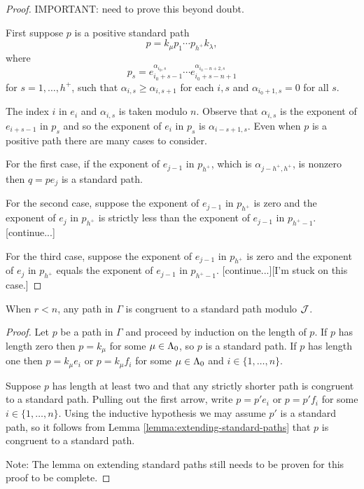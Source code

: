 \documentclass[a4paper, 11pt]{report}
\begin{document}
\begin{proof}{\color{red}
IMPORTANT: need to prove this beyond doubt.
}

First suppose $p$ is a positive standard path
\begin{equation*}
p=k_\mu p_1\cdots p_{h^+}k_\lambda,
\end{equation*}
where
\begin{equation*}
p_s = e_{i_0 +s-1}^{\alpha_{i_0,s}}\cdots e_{i_0+s-n+1}^{\alpha_{i_0-n+2,s}}
\end{equation*}
for $s=1,\ldots,h^+$, such that $\alpha_{i,s}\geq \alpha_{i,s+1}$ for each $i,s$ and $\alpha_{i_0+1,s}=0$ for all $s$.

The index $i$ in $e_i$ and $\alpha_{i,s}$ is taken modulo $n$. Observe that $\alpha_{i,s}$ is the exponent of $e_{i+s-1}$ in $p_s$ and so the exponent of $e_i$ in $p_s$ is $\alpha_{i-s+1,s}$. Even when $p$ is a positive path there are many cases to consider.

For the first case, if the exponent of $e_{j-1}$ in $p_{h^+}$, which is $\alpha_{j-h^+,h^+}$, is nonzero then $q=pe_j$ is a standard path.

For the second case, suppose the exponent of $e_{j-1}$ in $p_{h^+}$ is zero and the exponent of $e_j$ in $p_{h^+}$ is strictly less than the exponent of $e_{j-1}$ in $p_{h^+-1}$. [continue...]

For the third case, suppose the exponent of $e_{j-1}$ in $p_{h^+}$ is zero and the exponent of $e_j$ in $p_{h^+}$ equals the exponent of $e_{j-1}$ in $p_{h^+-1}$. [continue...][I'm stuck on this case.]

\end{proof}

\begin{proposition}\label{proposition:std-paths-span-quiver-algebra}
When $r<n$, any path in $\Gamma$ is congruent to a standard path modulo $\mathcal{J}$.
\end{proposition}

\begin{proof}
Let $p$ be a path in $\Gamma$ and proceed by induction on the length of $p$. If $p$ has length zero then $p=k_\mu$ for some $\mu\in\Lambda_0{}$, so $p$ is a standard path. If $p$ has length one then $p=k_\mu e_i$ or $p=k_\mu f_i$ for some $\mu\in\Lambda_0{}$ and $i\in\{1,\ldots,n\}$.

Suppose $p$ has length at least two and that any strictly shorter path is congruent to a standard path. Pulling out the first arrow, write $p=p'e_i$ or $p=p'f_i$ for some $i\in\{1,\ldots,n\}$. Using the inductive hypothesis we may assume $p'$ is a standard path, so it follows from Lemma \ref{lemma:extending-standard-paths} that $p$ is congruent to a standard path.

{\color{red}
Note: The lemma on extending standard paths still needs to be proven for this proof to be complete.}
\end{proof}
\end{document}
